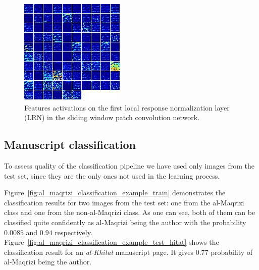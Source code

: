 \documentclass[conference,a4paper]{ieeetran}
\begin{document}
\begin{figure}[!b]
	\centering
  	\includegraphics[width=0.75\linewidth]{figures/norm1.png}
	\caption{Features activations on the first local response normalization layer (LRN) in the sliding window patch convolution network.}
  	\label{fig:lrn_activation}
\end{figure}

\subsection{Manuscript classification}

To assess quality of the classification pipeline we have used only images from the test set, since they are the only ones not used in the learning process. 

Figure~\ref{fig:al_maqrizi_classification_example_train} demonstrates the classification results for two images from the test set: one from the al-Maqrizi class and one from the non-al-Maqrizi class. As one can see, both of them can be classified quite confidently as al-Maqrizi being the author with the probability $0.0085$ and $0.94$ respectively. Figure~\ref{fig:al_maqrizi_classification_example_test_hitat} shows the classification result for an {\it al-Khitat} manuscript page. It gives $0.77$ probability of al-Maqrizi being the author.
\end{document}

